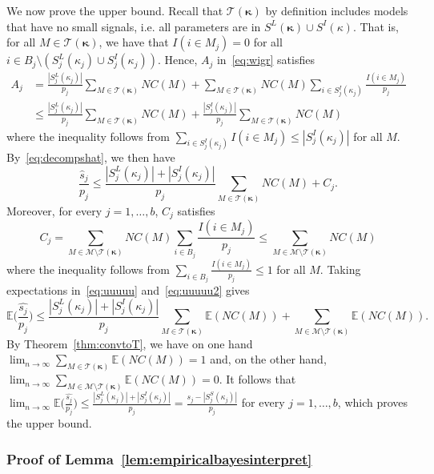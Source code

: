 \documentclass[
  12pt]{article}
\newcommand{\E}{\mathbb{E}}
\newcommand{\M}{\mathcal{M}}
\newcommand{\T}{\mathcal{T}}
\newcommand{\bkappa}{\boldsymbol{\kappa}}
\begin{document}
We now prove the upper bound. Recall that $\T(\bkappa)$ by definition includes models that have no small signals, i.e. all parameters are in $S^L(\bkappa) \cup S^I(\kappa)$. That is,
for all $M\in\T(\bkappa)$, we have that $I(i\in M_j)=0$ for all $i\in B_j\setminus(S_j^{L}(\kappa_j)\cup S_j^{I}(\kappa_j))$. Hence, $A_j$ in~\eqref{eq:wigr} satisfies
\begin{align*}
    A_j
   &= \frac{|S_j^{L}(\kappa_j)|}{p_j}\sum_{M \in \T(\bkappa)}NC(M)+\sum_{M \in \T(\bkappa)}NC(M)\sum_{i \in S_j^{I}(\kappa_j)}\frac{I(i\in M_j)}{p_j}\\
   &\leq\frac{|S_j^{L}(\kappa_j)|}{p_j}\sum_{M \in \T(\bkappa)}NC(M)+ \frac{|S_j^{I}(\kappa_j)|}{p_j}\sum_{M \in \T(\bkappa)}NC(M)
\end{align*}
where the inequality follows from $\sum_{i \in S_j^{I}(\kappa_j)} I(i\in M_j) \leq |S_j^{I}(\kappa_j)|$  for all $M$. By~\eqref{eq:decompshat}, we then have
\begin{equation}\label{eq:uuuuu}
    \frac{\hat{s}_j}{p_j}\leq \frac{|S_j^{L}(\kappa_j)|+|S_j^{I}(\kappa_j)|}{p_j}\sum_{M \in \T(\bkappa)}NC(M) + C_j.
\end{equation}
Moreover, for every $j=1,\ldots,b$, $C_j$ satisfies
\begin{equation}\label{eq:uuuuu2}
    C_j = \sum_{M \in \M\setminus \T(\bkappa)}NC(M)\sum_{i \in B_j}\frac{I(i\in M_j)}{p_j}\leq \sum_{M \in \M\setminus \T(\bkappa)}NC(M)
\end{equation}
where the inequality follows from $\sum_{i \in B_j}\frac{I(i\in M_j)}{p_j}\leq 1$ for all $M$.
Taking expectations in~\eqref{eq:uuuuu} and~\eqref{eq:uuuuu2} gives
\begin{equation*}
    \E\bigg(\frac{\widehat{s_j}}{p_j}\bigg) 
    \leq \frac{|S_j^{L}(\kappa_j)|+|S_j^{I}(\kappa_j)|}{p_j}\sum_{M \in \T(\bkappa)}\E(NC(M)) + \sum_{M \in \M\setminus \T(\bkappa)}\E(NC(M)).
\end{equation*}
 By Theorem~\ref{thm:convtoT}, we have on one hand $\lim_{n\to \infty}\sum_{M \in \T(\bkappa)}\E(NC(M))= 1$ and, on the other hand, $\lim_{n\to \infty}\sum_{M \in \M\setminus\T(\bkappa)}\E(NC(M))= 0$. It follows that $ \lim_{n\to \infty}\E\big(\frac{\widehat{s_j}}{p_j}\big) \leq  \frac{|S_j^{L}(\kappa_j)|+|S_j^{I}(\kappa_j)|}{p_j}= \frac{s_j-|S_j^{S}(\kappa_j)|}{p_j}$ for every $j=1,\ldots,b$, which proves the upper bound.

 \subsubsection{Proof of Lemma~\ref{lem:empiricalbayesinterpret}}
\end{document}
